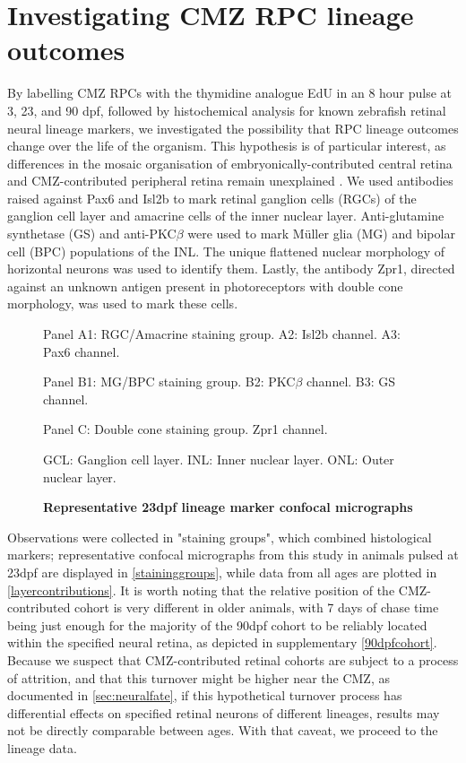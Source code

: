 \section{Investigating CMZ RPC lineage outcomes}

By labelling CMZ RPCs with the thymidine analogue EdU in an 8 hour pulse at 3, 23, and 90 dpf, followed by histochemical analysis for known zebrafish retinal neural lineage markers, we investigated the possibility that RPC lineage outcomes change over the life of the organism. This hypothesis is of particular interest, as differences in the mosaic organisation of embryonically-contributed central retina and CMZ-contributed peripheral retina remain unexplained \cite{Allison2010}. We used antibodies raised against Pax6 and Isl2b to mark retinal ganglion cells (RGCs) of the ganglion cell layer and amacrine cells of the inner nuclear layer. Anti-glutamine synthetase (GS) and anti-PKC$\beta$ were used to mark M\"{u}ller glia (MG) and bipolar cell (BPC) populations of the INL. The unique flattened nuclear morphology of horizontal neurons was used to identify them. Lastly, the antibody Zpr1, directed against an unknown antigen present in photoreceptors with double cone morphology, was used to mark these cells.

\begin{figure}[!h]
    \caption{{\bf Representative 23dpf lineage marker confocal micrographs}}
    Panel A1: RGC/Amacrine staining group. A2: Isl2b channel. A3: Pax6 channel.

    Panel B1: MG/BPC staining group. B2: PKC$\beta$ channel. B3: GS channel.

    Panel C: Double cone staining group. Zpr1 channel.

    GCL: Ganglion cell layer. INL: Inner nuclear layer. ONL: Outer nuclear layer.
    \label{staininggroups}
\end{figure}

Observations were collected in "staining groups", which combined histological markers; representative confocal micrographs from this study in animals pulsed at 23dpf are displayed in \autoref{staininggroups}, while data from all ages are plotted in \autoref{layercontributions}. It is worth noting that the relative position of the CMZ-contributed cohort is very different in older animals, with 7 days of chase time being just enough for the majority of the 90dpf cohort to be reliably located within the specified neural retina, as depicted in supplementary \autoref{90dpfcohort}. Because we suspect that CMZ-contributed retinal cohorts are subject to a process of attrition, and that this turnover might be higher near the CMZ, as documented in \autoref{sec:neuralfate}, if this hypothetical turnover process has differential effects on specified retinal neurons of different lineages, results may not be directly comparable between ages. With that caveat, we proceed to the lineage data.


